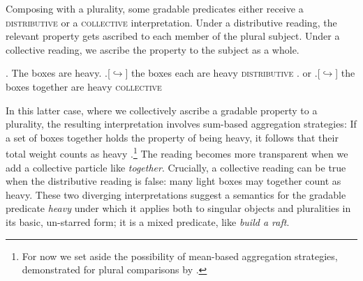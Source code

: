 \documentclass[linguex]{sp}
\begin{document}
Composing with a plurality, some gradable predicates either receive a \textsc{distributive} or a \textsc{collective} interpretation. Under a distributive reading, the relevant property gets ascribed to each member of the plural subject. Under a collective reading, we ascribe the property to the subject as a whole.

\ex. The boxes are heavy.
\a.[$\hookrightarrow$] the boxes each are heavy \hfill \textsc{distributive}
\z. or
\a.[$\hookrightarrow$] the boxes together are heavy \hfill \textsc{collective}

In this latter case, where we collectively ascribe a gradable property to a plurality, the resulting interpretation involves sum-based aggregation strategies: If a set of boxes together holds the property of being heavy, it follows that their total weight counts as heavy \citep{scha1984}.\footnote{For now we set aside the possibility of mean-based aggregation strategies, demonstrated for plural comparisons by \cite{scontrasetal2012}.} The reading becomes more transparent when we add a collective particle like \emph{together}. Crucially, a collective reading can be true when the distributive reading is false: many light boxes may together count as heavy. These two diverging interpretations suggest a semantics for the gradable predicate \emph{heavy} under which it applies both to singular objects and pluralities in its basic, un-starred form; it is a mixed predicate, like \emph{build a raft}. 
\end{document}
